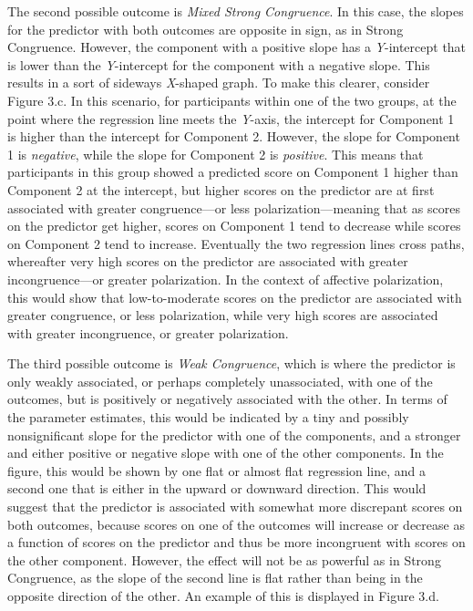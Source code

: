 \documentclass[authordate, meta, issue]{jote-new-article}
\begin{document}
	The second possible outcome is \emph{Mixed Strong Congruence}. In this case, the slopes for the predictor with both outcomes are opposite in sign, as in Strong Congruence. However, the component with a positive slope has a \emph{Y}-intercept that is lower than the \emph{Y}-intercept for the component with a negative slope. This results in a sort of sideways \emph{X}-shaped graph. To make this clearer, consider Figure 3.c. In this scenario, for participants within one of the two groups, at the point where the regression line meets the \emph{Y}-axis, the intercept for Component 1 is higher than the intercept for Component 2. However, the slope for Component 1 is \emph{negative}, while the slope for Component 2 is \emph{positive}. This means that participants in this group showed a predicted score on Component 1 higher than Component 2 at the intercept, but higher scores on the predictor are at first associated with greater congruence—or less polarization—meaning that as scores on the predictor get higher, scores on Component 1 tend to decrease while scores on Component 2 tend to increase. Eventually the two regression lines cross paths, whereafter very high scores on the predictor are associated with greater incongruence—or greater polarization. In the context of affective polarization, this would show that low-to-moderate scores on the predictor are associated with greater congruence, or less polarization, while very high scores are associated with greater incongruence, or greater polarization.



	The third possible outcome is \emph{Weak Congruence}, which is where the predictor is only weakly associated, or perhaps completely unassociated, with one of the outcomes, but is positively or negatively associated with the other. In terms of the parameter estimates, this would be indicated by a tiny and possibly nonsignificant slope for the predictor with one of the components, and a stronger and either positive or negative slope with one of the other components. In the figure, this would be shown by one flat or almost flat regression line, and a second one that is either in the upward or downward direction. This would suggest that the predictor is associated with somewhat more discrepant scores on both outcomes, because scores on one of the outcomes will increase or decrease as a function of scores on the predictor and thus be more incongruent with scores on the other component. However, the effect will not be as powerful as in Strong Congruence, as the slope of the second line is flat rather than being in the opposite direction of the other. An example of this is displayed in Figure 3.d.
\end{document}
